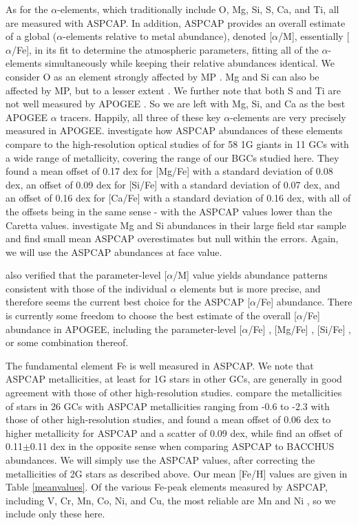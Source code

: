 \documentclass[onecolumn]{aa}
\begin{document}
As for the $\alpha$-elements, which  traditionally include O, Mg, Si, S, Ca, and Ti, all are measured with ASPCAP. In addition, ASPCAP provides an overall estimate of a global ($\alpha$-elements relative to metal abundance), denoted [$\alpha$/M], essentially [$\alpha$/Fe], in its fit to determine the atmospheric parameters, fitting all of the $\alpha$-elements simultaneously  while keeping their relative abundances identical. We consider O as an element strongly affected by MP \citep[and indeed ASPCAP  O abundances are particularly problematic for 2G stars -][]{Masseron2019}.  Mg and Si can also be affected by MP, but to a lesser extent \citep[e.g.,][]{Bastian2018}. We further note that both S and Ti are not well measured by APOGEE \citep{Henrik2020}. So we are left with Mg, Si, and Ca as the best APOGEE $\alpha$ tracers. Happily, all three of these key $\alpha$-elements are very precisely measured in APOGEE. \citet{Nidever2020} investigate how ASPCAP abundances of these elements compare to the high-resolution optical studies of \citet{Carretta2009} for 58 1G giants in 11 GCs with a wide range of metallicity, covering the range of our BGCs studied here. They found a mean offset of 0.17 dex for [Mg/Fe]
with a standard deviation of 0.08 dex, an offset of 0.09 dex for [Si/Fe] with a standard deviation of 0.07 dex, and an offset of 0.16 dex for [Ca/Fe] with a standard deviation of 0.16 dex, with all of the offsets being in the same sense - with the ASPCAP values lower than the Caretta values. \citet{Fernandez-Trincado2020} investigate Mg and Si abundances in their large field star sample and find small mean ASPCAP overestimates but null within the errors. Again, we will use the ASPCAP abundances at face value. 
 
\citet{Nidever2020} also verified that the parameter-level [$\alpha$/M] value yields abundance patterns consistent with those of the individual $\alpha$ elements but is more precise, and therefore seems the current best choice for the ASPCAP [$\alpha$/Fe] abundance. 
There is currently some freedom to choose the best estimate of the overall [$\alpha$/Fe] abundance in APOGEE, including the parameter-level [$\alpha$/Fe]
\citep[e.g.,][]{Nidever2020}, [Mg/Fe] \citep[e.g.,][]{Rojas-Arriagada2019}, [Si/Fe] \citep[e.g.,][]{Horta2020}, or some combination thereof. 

The fundamental element Fe is well measured in ASPCAP. We note that ASPCAP metallicities, at least for 1G stars in other GCs, are generally in good agreement with those of other high-resolution studies. \citet{Nidever2020} compare the metallicities of stars in 26 GCs with ASPCAP metallicities ranging from -0.6 to -2.3 with those of other high-resolution studies, and found a mean offset of 0.06 dex to higher metallicity for ASPCAP and a scatter of 0.09 dex, while \citet{Fernandez-Trincado2020} find an offset of 0.11$\pm$0.11 dex in the opposite sense when comparing ASPCAP to BACCHUS abundances. We will simply use the ASPCAP values, after correcting the metallicities of 2G stars as described above. Our mean [Fe/H] values are given in Table \ref{meanvalues}. 
Of the various Fe-peak elements measured by ASPCAP, including 
V, Cr, Mn, Co, Ni, and Cu, the most reliable are Mn and Ni \citet{Henrik2020}, so we include only these here. 
\end{document}
